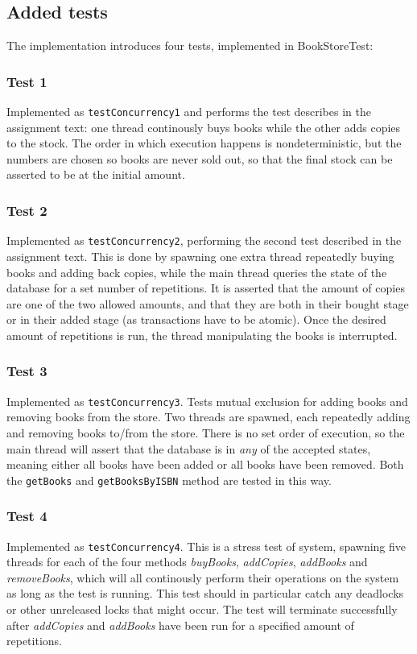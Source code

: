 \documentclass[12pt]{article}
\begin{document}
\subsection*{Added tests}
The implementation introduces four tests, implemented in BookStoreTest:
\subsubsection*{Test 1}
Implemented as \verb|testConcurrency1| and performs the test describes in the assignment text: one thread continously buys books while the other adds copies to the stock. The order in which execution happens is nondeterministic, but the numbers are chosen so books are never sold out, so that the final stock can be asserted to be at the initial amount.
\subsubsection*{Test 2}
Implemented as \verb|testConcurrency2|, performing the second test described in the assignment text. This is done by spawning one extra thread repeatedly buying books and adding back copies, while the main thread queries the state of the database for a set number of repetitions. It is asserted that the amount of copies are one of the two allowed amounts, and that they are both in their bought stage or in their added stage (as transactions have to be atomic). Once the desired amount of repetitions is run, the thread manipulating the books is interrupted.
\subsubsection*{Test 3}
Implemented as \verb|testConcurrency3|. Tests mutual exclusion for adding books and removing books from the store. Two threads are spawned, each repeatedly adding and removing books to/from the store. There is no set order of execution, so the main thread will assert that the database is in \emph{any} of the accepted states, meaning either all books have been added or all books have been removed. Both the \verb|getBooks| and \verb|getBooksByISBN| method are tested in this way.
\subsubsection*{Test 4}
Implemented as \verb|testConcurrency4|. This is a stress test of system, spawning five threads for each of the four methods \emph{buyBooks}, \emph{addCopies}, \emph{addBooks} and \emph{removeBooks}, which will all continously perform their operations on the system as long as the test is running. This test should in particular catch any deadlocks or other unreleased locks that might occur. The test will terminate successfully after \emph{addCopies} and \emph{addBooks} have been run for a specified amount of repetitions.
\end{document}

